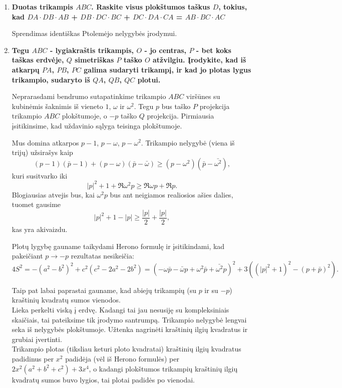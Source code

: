 \begin{enumerate}
\item \textbf{Duotas trikampis $ABC$. Raskite visus plokštumos taškus $D$, tokius, kad $DA\cdot DB\cdot AB$ + $DB\cdot DC\cdot BC$ + $DC\cdot DA\cdot CA$ = $AB\cdot BC\cdot AC$}
\medskip

Sprendimas identiškas Ptolemėjo nelygybės įrodymui.
\medskip

\item \textbf{Tegu $ABC$ - lygiakraštis trikampis, $O$ - jo centras, $P$ - bet koks taškas erdvėje, $Q$ simetriškas $P$ taško $O$ atžvilgiu. Įrodykite, kad iš atkarpų $PA$, $PB$, $PC$ galima sudaryti trikampį, ir kad jo plotas lygus trikampio, sudaryto iš $QA$, $QB$, $QC$ plotui.}
\medskip

Neprarasdami bendrumo sutapatinkime trikampio $ABC$ viršūnes su kubinėmis šaknimis iš vieneto $1$, $\omega$ ir $\omega^2$. Tegu $p$ bus taško $P$ projekcija trikampio $ABC$ plokštumoje, o $-p$ taško $Q$ projekcija. Pirmiausia įsitikinsime, kad uždavinio sąlyga teisinga plokštumoje.

Mus domina atkarpos $p-1$, $p-\omega$, $p-\omega^2$. Trikampio nelygybė (viena iš trijų) užsirašys kaip
$$(p-1)(\bar{p}-1) + (p-\omega)(\bar{p}-\bar{\omega}) \geq (p-\omega^2)(\bar{p}-\bar{\omega^2}),$$ kuri susitvarko iki
$$|p|^2 + 1 + \Re\omega^2p \geq \Re\omega p + \Re p.$$ Blogiausias atvejis bus, kai $\omega^2 p$ bus ant neigiamos realiosios ašies dalies, tuomet gausime $$|p|^2 + 1 -|p| \geq \frac{|p|}{2} + \frac{|p|}{2},$$ kas yra akivaizdu.

Plotų lygybę gauname taikydami Herono formulę ir įsitikindami, kad pakeičiant $p \to -p$ rezultatas nesikeičia:
$$4S^2=-(a^2 - b^2)^2 + c^2(c^2 - 2a^2 - 2b^2) = (-\omega \bar{p} - \bar{\omega}p + \omega ^2 \bar{p} + \bar{\omega^2}p)^2 + 3((|p|^2 + 1)^2 - (p+\bar{p})^2).$$

Taip pat labai paprastai gauname, kad abiejų trikampių (su $p$ ir su $-p$) kraštinių kvadratų sumos vienodos.
\\
Lieka perkelti viską į erdvę. Kadangi tai jau nesusiję su kompleksiniais skaičiais, tai pateiksime tik įrodymo santrumpą.
Trikampio nelygybė lengvai seka iš nelygybės plokštumoje. Užtenka nagrinėti kraštinių ilgių kvadratus ir grubiai įvertinti.
\\
Trikampio plotas (tiksliau keturi ploto kvadratai) kraštinių ilgių kvadratus padidinus per $x^2$ padidėja (vėl iš Herono formulės) per $2x^2(a^2 + b^2 + c^2) + 3x^4$, o kadangi plokštumos trikampių kraštinių ilgių kvadratų sumos buvo lygios, tai plotai padidės po vienodai.
 

\end{enumerate}

